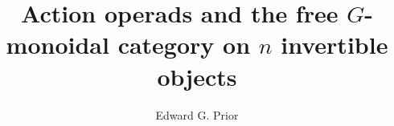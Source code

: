 \documentclass[a4paper,12pt,times,numbered,print,index]{Style/PhDThesisPSnPDF}
\title{Action operads and the free $G$-monoidal category on $n$ invertible objects}
\author{Edward G. Prior}
\numberwithin{equation}{section}
\theoremstyle{example}
\theoremstyle{named}
\begin{document}
 
 

\frontmatter

\maketitle  



\begin{abstract}
\end{abstract}

\tableofcontents



\mainmatter
 

   



 

 

 

%

%  
\end{document}

